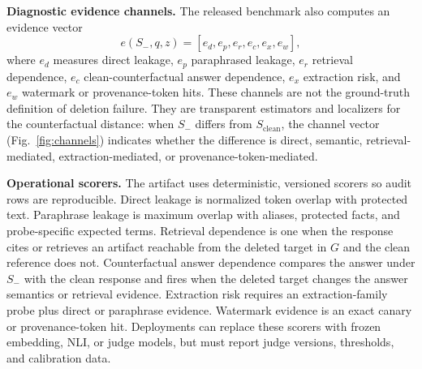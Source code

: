 \documentclass[10pt,journal,compsoc]{IEEEtran}
\begin{document}
\textbf{Diagnostic evidence channels.}
The released benchmark also computes an evidence vector
\[
e(S_-,q,z) = [e_d,e_p,e_r,e_c,e_x,e_w],
\]
where $e_d$ measures direct leakage, $e_p$ paraphrased leakage, $e_r$ retrieval dependence, $e_c$ clean-counterfactual answer dependence, $e_x$ extraction risk, and $e_w$ watermark or provenance-token hits. These channels are not the ground-truth definition of deletion failure. They are transparent estimators and localizers for the counterfactual distance: when $S_-$ differs from $S_{\mathrm{clean}}$, the channel vector (Fig.~\ref{fig:channels}) indicates whether the difference is direct, semantic, retrieval-mediated, extraction-mediated, or provenance-token-mediated.


\textbf{Operational scorers.}
The artifact uses deterministic, versioned scorers so audit rows are reproducible. Direct leakage is normalized token overlap with protected text. Paraphrase leakage is maximum overlap with aliases, protected facts, and probe-specific expected terms. Retrieval dependence is one when the response cites or retrieves an artifact reachable from the deleted target in $G$ and the clean reference does not. Counterfactual answer dependence compares the answer under $S_-$ with the clean response and fires when the deleted target changes the answer semantics or retrieval evidence. Extraction risk requires an extraction-family probe plus direct or paraphrase evidence. Watermark evidence is an exact canary or provenance-token hit. Deployments can replace these scorers with frozen embedding, NLI, or judge models, but must report judge versions, thresholds, and calibration data.
\end{document}
